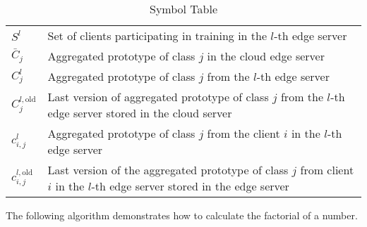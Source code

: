 \documentclass{article}
\begin{document}
\begin{table}[H]
\begin{tabular}{@{}lp{10cm}@{}}
        \( S^{l} \)                           & Set of clients participating in training in the \( l \)-th edge server                                                                \\
        \( \bar{C}_j \)                       & Aggregated prototype of class $j$ in the cloud edge server                                                                            \\
        \( C^l_j \)                           & Aggregated prototype of class $j$ from the \( l \)-th edge server                                                                     \\
        \( C^{l,\text{old}}_j \)              & Last version of aggregated prototype of class $j$ from the \( l \)-th edge server stored in the cloud server                          \\
        \( c^l_{i, j} \)                      & Aggregated prototype of class $j$ from the client \(i\) in  the \( l \)-th edge server                                                \\
        \( c_{i, j}^{l, \text{old}} \)        & Last version of the aggregated prototype of class \( j \) from client \( i \) in the \( l \)-th edge server stored in the edge server \\
        \bottomrule
    \end{tabular}
    \caption{Symbol Table}
\end{table}


The following algorithm demonstrates how to calculate the factorial of a number.
\end{document}

